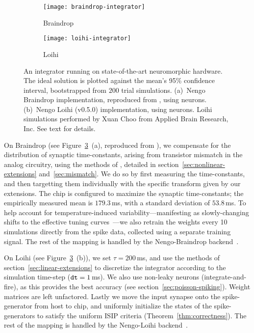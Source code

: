 \begin{figure}
  \centering
  \begin{subfigure}{.5\textwidth}
    \centering
    \texttt{[image: braindrop-integrator]}
    \caption{Braindrop}
    \label{fig:braindrop-integrator}
  \end{subfigure}%
  \begin{subfigure}{.5\textwidth}
    \centering
    \texttt{[image: loihi-integrator]}
    \caption{Loihi}
    \label{fig:loihi-integrator}
  \end{subfigure}
  \caption[Dynamical integration on Braindrop and Loihi.]{
    An integrator running on state-of-the-art neuromorphic hardware.
    The ideal solution is plotted against the mean's 95\% confidence interval, bootstrapped from $200$ trial simulations.
    (a)~Nengo Braindrop implementation, reproduced from \citet[][Figure~15]{braindrop2019}, using  neurons. 
    (b)~Nengo Loihi (v0.5.0) implementation, using  neurons.
    Loihi simulations performed by Xuan Choo from Applied Brain Research, Inc.
    See text for details.
  }\label{fig:integrator-neuromorphic}
\end{figure}

On Braindrop (see Figure~\ref{fig:integrator-neuromorphic}~(a), reproduced from \citet[][Figure~15]{braindrop2019}), we compensate for the distribution of synaptic time-constants, arising from transistor mismatch in the analog circuitry, using the methods of \citet{voelker2017iscas}, detailed in section~\ref{sec:nonlinear-extensions} and~\ref{sec:mismatch}.
We do so by first measuring the time-constants, and then targetting them individually with the specific transform given by our extensions.
The chip is configured to maximize the synaptic time-constants; the empirically measured mean is $179.3$\,ms, with a standard deviation of $53.8$\,ms.
To help account for temperature-induced variability---manifesting as slowly-changing shifts to the effective tuning curves~\citep{abrams2017}---we also retrain the weights every 10 simulations directly from the spike data, collected using a separate training signal.
The rest of the mapping is handled by the Nengo-Braindrop backend~\citep{neckar2018optimizing, braindrop2019}.

On Loihi (see Figure~\ref{fig:integrator-neuromorphic}~(b)), we set $\tau = 200$\,ms, and use the methods of section~\ref{sec:linear-extensions} to discretize the integrator according to the simulation time-step ($\texttt{dt}{} = 1$\,ms).
We also use non-leaky neurons (integrate-and-fire), as this provides the best accuracy (see section~\ref{sec:poisson-spiking}).
Weight matrices are left unfactored.
Lastly we move the input synapse onto the spike-generator from host to chip, and uniformly initialize the states of the spike-generators to satisfy the uniform ISIP criteria (Theorem~\ref{thm:correctness}).
The rest of the mapping is handled by the Nengo-Loihi backend~\citep{nengoloihi}.

